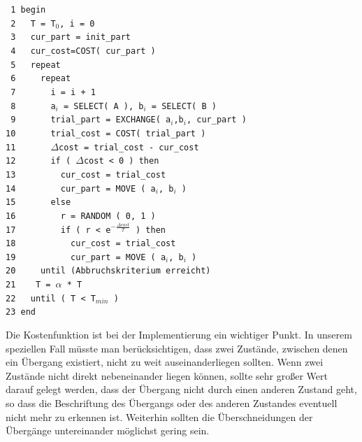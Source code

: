 \noindent
\verb| 1 begin|\\
\verb| 2   T = T|$_0$\verb|, i = 0|\\
\verb| 3   cur_part = init_part|\\
\verb| 4   cur_cost=COST( cur_part )|\\
\verb| 5   repeat|\\
\verb| 6     repeat|\\
\verb| 7       i = i + 1|\\
\verb| 8       a|$_i$\verb| = SELECT( A ), b|$_i$\verb| = SELECT( B )|\\
\verb| 9       trial_part = EXCHANGE( a|$_i$\verb|,b|$_i$\verb|, cur_part )|\\
\verb|10       trial_cost = COST( trial_part )|\\
\verb|11       |$\Delta$\verb|cost = trial_cost - cur_cost|\\
\verb|12       if ( |$\Delta$\verb|cost < 0 ) then|\\
\verb|13         cur_cost = trial_cost|\\
\verb|14         cur_part = MOVE ( a|$_i$\verb|, b|$_i$\verb| )|\\
\verb|15       else|\\
\verb|16         r = RANDOM ( 0, 1 )|\\
\verb|17         if ( r < e|$^{-\frac{\Delta cost}{T}}$\verb| ) then|\\
\verb|18           cur_cost = trial_cost|\\
\verb|19           cur_part = MOVE ( a|$_i$\verb|, b|$_i$\verb| )|\\
\verb|20     until (Abbruchskriterium erreicht)|\\
\verb|21    T = |$\alpha$\verb| * T|\\
\verb|22   until ( T < T|$_{min}$\verb| )|\\
\verb|23 end|\\ 
\vspace{10pt}

Die Kostenfunktion ist bei der Implementierung ein wichtiger
Punkt. In unserem speziellen Fall müsste man berücksichtigen, dass zwei
Zustände, zwischen denen ein Übergang existiert, nicht zu weit auseinanderliegen
sollten. Wenn zwei Zustände nicht direkt nebeneinander liegen können, sollte sehr
großer Wert darauf gelegt werden, dass der Übergang nicht durch einen anderen
Zustand geht, so dass die Beschriftung des Übergangs oder des anderen Zustandes
eventuell nicht mehr zu erkennen ist. Weiterhin sollten die Überschneidungen der
Übergänge untereinander möglichst gering sein.
\vspace{10pt}


